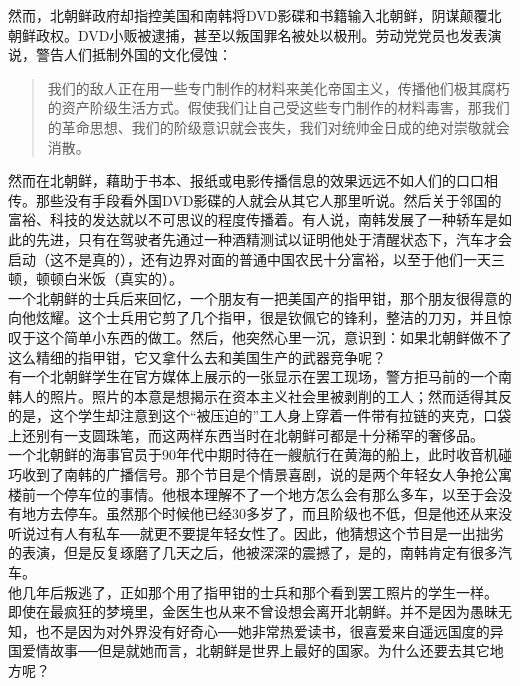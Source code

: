 然而，北朝鲜政府却指控美国和南韩将DVD影碟和书籍输入北朝鲜，阴谋颠覆北朝鲜政权。DVD小贩被逮捕，甚至以叛国罪名被处以极刑。劳动党党员也发表演说，警告人们抵制外国的文化侵蚀：\\

\begin{quote}
	我们的敌人正在用一些专门制作的材料来美化帝国主义，传播他们极其腐朽的资产阶级生活方式。假使我们让自己受这些专门制作的材料毒害，那我们的革命思想、我们的阶级意识就会丧失，我们对统帅金日成的绝对崇敬就会消散。\\
\end{quote}

然而在北朝鲜，藉助于书本、报纸或电影传播信息的效果远远不如人们的口口相传。那些没有手段看外国DVD影碟的人就会从其它人那里听说。然后关于邻国的富裕、科技的发达就以不可思议的程度传播着。有人说，南韩发展了一种轿车是如此的先进，只有在驾驶者先通过一种酒精测试以证明他处于清醒状态下，汽车才会启动（这不是真的），还有边界对面的普通中国农民十分富裕，以至于他们一天三顿，顿顿白米饭（真实的）。\\

一个北朝鲜的士兵后来回忆，一个朋友有一把美国产的指甲钳，那个朋友很得意的向他炫耀。这个士兵用它剪了几个指甲，很是钦佩它的锋利，整洁的刀刃，并且惊叹于这个简单小东西的做工。然后，他突然心里一沉，意识到：如果北朝鲜做不了这么精细的指甲钳，它又拿什么去和美国生产的武器竞争呢？\\

有一个北朝鲜学生在官方媒体上展示的一张显示在罢工现场，警方拒马前的一个南韩人的照片。照片的本意是想揭示在资本主义社会里被剥削的工人；然而适得其反的是，这个学生却注意到这个“被压迫的”工人身上穿着一件带有拉链的夹克，口袋上还别有一支圆珠笔，而这两样东西当时在北朝鲜可都是十分稀罕的奢侈品。\\

一个北朝鲜的海事官员于90年代中期时待在一艘航行在黄海的船上，此时收音机碰巧收到了南韩的广播信号。那个节目是个情景喜剧，说的是两个年轻女人争抢公寓楼前一个停车位的事情。他根本理解不了一个地方怎么会有那么多车，以至于会没有地方去停车。虽然那个时候他已经30多岁了，而且阶级也不低，但是他还从来没听说过有人有私车──就更不要提年轻女性了。因此，他猜想这个节目是一出拙劣的表演，但是反复琢磨了几天之后，他被深深的震撼了，是的，南韩肯定有很多汽车。\\

他几年后叛逃了，正如那个用了指甲钳的士兵和那个看到罢工照片的学生一样。\\

即使在最疯狂的梦境里，金医生也从来不曾设想会离开北朝鲜。并不是因为愚昧无知，也不是因为对外界没有好奇心──她非常热爱读书，很喜爱来自遥远国度的异国爱情故事──但是就她而言，北朝鲜是世界上最好的国家。为什么还要去其它地方呢？\\

